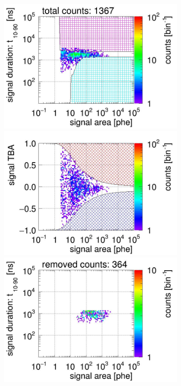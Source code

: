 \begin{landscape}
\begin{figure}[!p]
\begin{subfigure}[t]{0.33\textwidth}
		\includegraphics[width=\figurewidth,clip,trim={0 98 0 0}]{Figures/GasTest/CutsValid/res64767/pdpa14Vecfig64767.jpg}
		\includegraphics[width=\figurewidth,clip,trim={0 98 0 40}]{Figures/GasTest/CutsValid/res64767/tbapa14Vecfig64767.jpg}
		\includegraphics[width=\figurewidth,clip,trim={0 98 0 10}]{Figures/GasTest/CutsValid/res64767/pdpaX14Vecfig64767.jpg}

\end{subfigure}
\end{figure}
\end{landscape}
